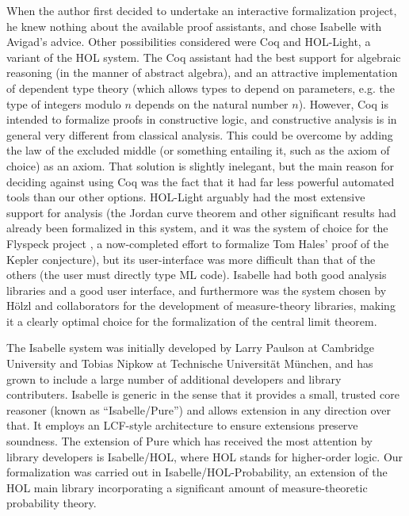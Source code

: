 \documentclass[leqno]{article}
\theoremstyle{definition}
\begin{document}
When the author first decided to undertake an interactive formalization project, he knew nothing about the available proof assistants, and chose Isabelle with Avigad's advice. Other possibilities considered were Coq and HOL-Light, a variant of the HOL system. The Coq assistant \cite{coq-ref} had the best support for algebraic reasoning (in the manner of abstract algebra), and an attractive implementation of dependent type theory (which allows types to depend on parameters, e.g. the type of integers modulo $n$ depends on the natural number $n$). However, Coq is intended to formalize proofs in constructive logic, and constructive analysis is in general very different from classical analysis. This could be overcome by adding the law of the excluded middle (or something entailing it, such as the axiom of choice) as an axiom. That solution is slightly inelegant, but the main reason for deciding against using Coq was the fact that it had far less powerful automated tools than our other options. HOL-Light \cite{harrison-hol-light} arguably had the most extensive support for analysis (the Jordan curve theorem \cite{hales-jordan} and other significant results had already been formalized in this system, and it was the system of choice for the Flyspeck project \cite{hales-kepler}, a now-completed effort to formalize Tom Hales' proof of the Kepler conjecture), but its user-interface was more difficult than that of the others (the user must directly type ML code). Isabelle had both good analysis libraries and a good user interface, and furthermore was the system chosen by H\"olzl and collaborators for the development of measure-theory libraries, making it a clearly optimal choice for the formalization of the central limit theorem.

The Isabelle system was initially developed by Larry Paulson at Cambridge University and Tobias Nipkow at Technische Universit\"at M\"unchen, and has grown to include a large number of additional developers and library contributers. Isabelle is generic in the sense that it provides a small, trusted core reasoner (known as ``Isabelle/Pure'') and allows extension in any direction over that. It employs an LCF-style architecture \cite{gordon-lcf} to ensure extensions preserve soundness. The extension of Pure which has received the most attention by library developers is Isabelle/HOL, where HOL stands for higher-order logic. Our formalization was carried out in Isabelle/HOL-Probability, an extension of the HOL main library incorporating a significant amount of measure-theoretic probability theory.
\end{document}
